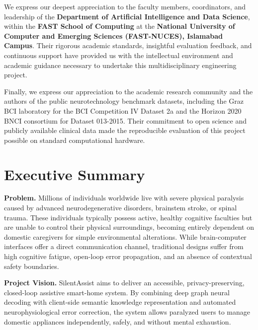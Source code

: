 \documentclass[12pt,a4paper]{report}
\begin{document}
We express our deepest appreciation to the faculty members, coordinators, and leadership of the \textbf{Department of Artificial Intelligence and Data Science}, within the \textbf{FAST School of Computing} at the \textbf{National University of Computer and Emerging Sciences (FAST-NUCES), Islamabad Campus}. Their rigorous academic standards, insightful evaluation feedback, and continuous support have provided us with the intellectual environment and academic guidance necessary to undertake this multidisciplinary engineering project.

Finally, we express our appreciation to the academic research community and the authors of the public neurotechnology benchmark datasets, including the Graz BCI laboratory for the BCI Competition IV Dataset 2a and the Horizon 2020 BNCI consortium for Dataset 013-2015. Their commitment to open science and publicly available clinical data made the reproducible evaluation of this project possible on standard computational hardware.

\newpage
\chapter*{Executive Summary}

\textbf{Problem.} Millions of individuals worldwide live with severe physical paralysis caused by advanced neurodegenerative disorders, brainstem stroke, or spinal trauma. These individuals typically possess active, healthy cognitive faculties but are unable to control their physical surroundings, becoming entirely dependent on domestic caregivers for simple environmental alterations. While brain-computer interfaces offer a direct communication channel, traditional designs suffer from high cognitive fatigue, open-loop error propagation, and an absence of contextual safety boundaries.

\textbf{Project Vision.} SilentAssist aims to deliver an accessible, privacy-preserving, closed-loop assistive smart-home system. By combining deep graph neural decoding with client-side semantic knowledge representation and automated neurophysiological error correction, the system allows paralyzed users to manage domestic appliances independently, safely, and without mental exhaustion.
\end{document}
